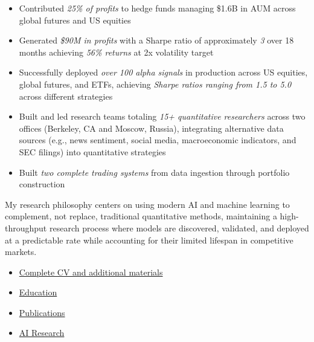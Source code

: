 \documentclass[11pt, letterpaper]{article}
\begin{document}
  \begin{itemize}
    \item Contributed \textit{25\% of profits} to hedge funds managing
      \$1.6B in AUM across global futures and US equities

    \item Generated \textit{\$90M in profits} with a Sharpe ratio of
      approximately \textit{3} over 18 months
      achieving \textit{56\% returns} at 2x volatility target

    \item Successfully deployed \textit{over 100 alpha signals} in
      production across US equities, global futures, and ETFs, achieving
      \textit{Sharpe ratios ranging from 1.5 to 5.0} across different
      strategies

    \item Built and led research teams totaling \textit{15+ quantitative
      researchers} across two offices (Berkeley, CA and Moscow, Russia),
      integrating alternative data sources (e.g., news sentiment, social media,
      macroeconomic indicators, and SEC filings) into quantitative strategies

    \item Built \textit{two complete trading systems} from data ingestion
      through portfolio construction
  \end{itemize}

  My research philosophy centers on using modern AI and machine learning to
  complement, not replace, traditional quantitative methods, maintaining a
  high-throughput research process where models are discovered, validated, and
  deployed at a predictable rate while accounting for their limited lifespan in
  competitive markets.

  \begin{itemize}
    \item \href{https://gpsaggese.github.io/}{Complete CV and additional materials}

    \item \href{https://gpsaggese.github.io/03_education/}{Education}

    \item \href{https://gpsaggese.github.io/05_publications/}{Publications}

    \item \href{https://gpsaggese.github.io/06_research/}{AI Research}
  \end{itemize}

\end{document}
